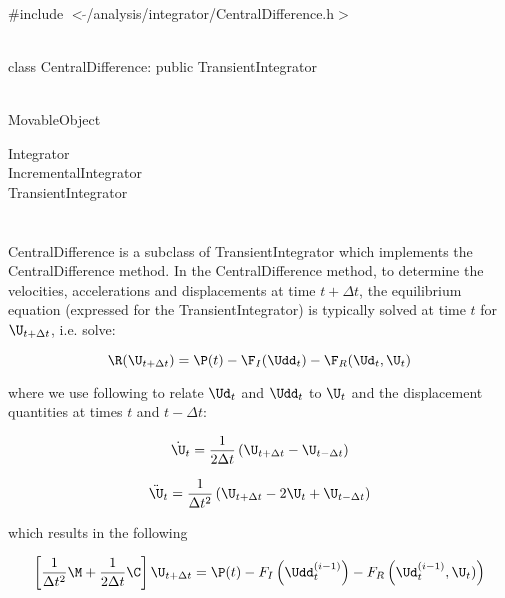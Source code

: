 
   \\
\#include $<\tilde{ }$/analysis/integrator/CentralDifference.h$>$  


  \\
class CentralDifference: public TransientIntegrator  


 \\
MovableObject 

\indent\indent Integrator \\
\indent\indent\indent IncrementalIntegrator \\
\indent\indent\indent\indent TransientIntegrator \\
\indent\indent\indent\indent{} \\

 \\ 
\indent CentralDifference is a subclass of TransientIntegrator which implements
the CentralDifference method. In the CentralDifference method, to determine the
velocities, accelerations and displacements at time $t + \Delta t$,
the equilibrium equation (expressed for the TransientIntegrator) is
typically solved at time $t$ for $\U_{t+\Delta t}$, i.e. solve: 

$$ \R (\U_{t+ \Delta t}) = \P(t) - \F_I(\Udd_{t})
- \F_R(\Ud_{t},\U_{t}) $$


\noindent where we use following to relate $\Ud_{t}$ and $\Udd_{t}$ to
$\U_{t}$ and the displacement quantities at times $t$ and $t - \Delta
t$: 

$$
\dot \U_{t} = \frac{1}{2 \Delta t} \left(
\U_{t + \Delta t} -  \U_{t - \Delta t} \right)
$$


$$
\ddot \U_{t} = \frac{1}{\Delta t^2} \left(
\U_{t + \Delta t} - 2 \U_t + \U_{t - \Delta t}\right)
$$



\noindent which results in the following 

$$ \left[ \frac{1}{\Delta t^2} \M + \frac{1}{2 \Delta t}
\C \right] \U_{t + \Delta t} = \P(t) - F_I \left(\Udd_t^{(i-1)}
\right)
-F_R\left( \Ud_t^{(i-1)}, \U_t)\right) $$

\\

